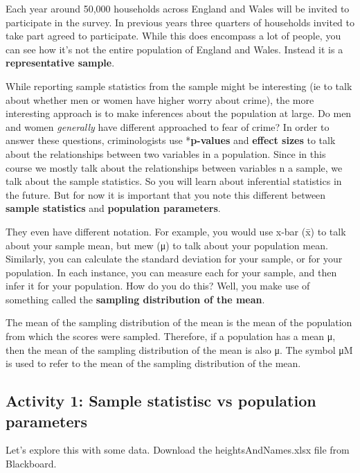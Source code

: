 \documentclass[]{book}
\theoremstyle{definition}
\theoremstyle{definition}
\theoremstyle{definition}
\theoremstyle{remark}
\begin{document}
Each year around 50,000 households across England and Wales will be
invited to participate in the survey. In previous years three quarters
of households invited to take part agreed to participate. While this
does encompass a lot of people, you can see how it's not the entire
population of England and Wales. Instead it is a \textbf{representative
sample}.

While reporting sample statistics from the sample might be interesting
(ie to talk about whether men or women have higher worry about crime),
the more interesting approach is to make inferences about the population
at large. Do men and women \emph{generally} have different approached to
fear of crime? In order to answer these questions, criminologists use
*\textbf{p-values} and \textbf{effect sizes} to talk about the
relationships between two variables in a population. Since in this
course we mostly talk about the relationships between variables n a
sample, we talk about the sample statistics. So you will learn about
inferential statistics in the future. But for now it is important that
you note this different between \textbf{sample statistics} and
\textbf{population parameters}.

They even have different notation. For example, you would use x-bar (x̄)
to talk about your sample mean, but mew (μ) to talk about your
population mean. Similarly, you can calculate the standard deviation for
your sample, or for your population. In each instance, you can measure
each for your sample, and then infer it for your population. How do you
do this? Well, you make use of something called the \textbf{sampling
distribution of the mean}.

The mean of the sampling distribution of the mean is the mean of the
population from which the scores were sampled. Therefore, if a
population has a mean μ, then the mean of the sampling distribution of
the mean is also μ. The symbol μM is used to refer to the mean of the
sampling distribution of the mean.

\hypertarget{activity-1-sample-statistisc-vs-population-parameters}{%
\subsection{Activity 1: Sample statistisc vs population
parameters}\label{activity-1-sample-statistisc-vs-population-parameters}}

Let's explore this with some data. Download the heightsAndNames.xlsx
file from Blackboard.
\end{document}
